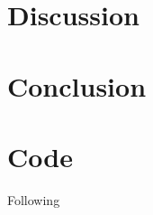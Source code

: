 \documentclass[11pt,a4paper]{article}
\begin{document}
\begin{multicols*}{2}

\section{\label{sect:discuss}Discussion}
\section{\label{sect:conclusion}Conclusion}


 

\end{multicols*}


\appendix*
\section{Code}
Following



\end{document}
